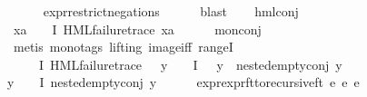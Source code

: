 \begin{isabellebody}
\ \ \ \ \isamarkupfalse%
\ expr{\isacharunderscore}{\kern0pt}{}{\isacharunderscore}{\kern0pt}restrict{\isacharunderscore}{\kern0pt}negations\isanewline
\ \ \ \ \isamarkupfalse%
\ blast\isanewline
\ \ \isamarkupfalse%
\ hml{\isacharunderscore}{\kern0pt}conj\ \isamarkupfalse%
\ {\isachardoublequoteopen}{\isasymforall}x{}a\ {\isasymin}\ {\isacharparenleft}{\kern0pt}{\isasymPhi}\ {\isacharbackquote}{\kern0pt}\ I{\isacharparenright}{\kern0pt}{\isachardot}{\kern0pt}\ HML{\isacharunderscore}{\kern0pt}failure{\isacharunderscore}{\kern0pt}trace\ x{}a{\isachardoublequoteclose}\isanewline
\ \ \ \ \isamarkupfalse%
\ mon{\isacharunderscore}{\kern0pt}conj{\isacharparenleft}{\kern0pt}{}{\isacharparenright}{\kern0pt}\ \isanewline
\ \ \ \ \isamarkupfalse%
\ {\isacharparenleft}{\kern0pt}metis\ {\isacharparenleft}{\kern0pt}mono{\isacharunderscore}{\kern0pt}tags{\isacharcomma}{\kern0pt}\ lifting{\isacharparenright}{\kern0pt}\ image{\isacharunderscore}{\kern0pt}iff\ rangeI{\isacharparenright}{\kern0pt}\isanewline
\ \ \isamarkupfalse%
\ \isamarkupfalse%
\ {\isachardoublequoteopen}{\isacharparenleft}{\kern0pt}{\isasymexists}{\isasympsi}\ {\isasymin}\ {\isacharparenleft}{\kern0pt}{\isasymPhi}\ {\isacharbackquote}{\kern0pt}\ I{\isacharparenright}{\kern0pt}{\isachardot}{\kern0pt}\ {\isacharparenleft}{\kern0pt}HML{\isacharunderscore}{\kern0pt}failure{\isacharunderscore}{\kern0pt}trace\ {\isasympsi}{\isacharparenright}{\kern0pt}\ {\isasymand}\ {\isacharparenleft}{\kern0pt}{\isasymforall}y\ {\isasymin}\ {\isacharparenleft}{\kern0pt}{\isasymPhi}\ {\isacharbackquote}{\kern0pt}\ I{\isacharparenright}{\kern0pt}{\isachardot}{\kern0pt}\ {\isasympsi}\ {\isasymnoteq}\ y\ {\isasymlongrightarrow}\ nested{\isacharunderscore}{\kern0pt}empty{\isacharunderscore}{\kern0pt}conj\ y{\isacharparenright}{\kern0pt}{\isacharparenright}{\kern0pt}\ {\isasymor}\ \isanewline
{\isacharparenleft}{\kern0pt}{\isasymforall}y\ {\isasymin}\ {\isacharparenleft}{\kern0pt}{\isasymPhi}\ {\isacharbackquote}{\kern0pt}\ I{\isacharparenright}{\kern0pt}{\isachardot}{\kern0pt}\ nested{\isacharunderscore}{\kern0pt}empty{\isacharunderscore}{\kern0pt}conj\ y{\isacharparenright}{\kern0pt}{\isachardoublequoteclose}\isanewline
\ \ \ \ \isamarkupfalse%
\ expr{\isacharunderscore}{\kern0pt}{}{\isacharunderscore}{\kern0pt}expr{\isacharunderscore}{\kern0pt}{}{\isacharunderscore}{\kern0pt}ft{\isacharunderscore}{\kern0pt}to{\isacharunderscore}{\kern0pt}recursive{\isacharunderscore}{\kern0pt}ft\ e{}\ e{}\ e{}\isanewline

\end{isabellebody}
